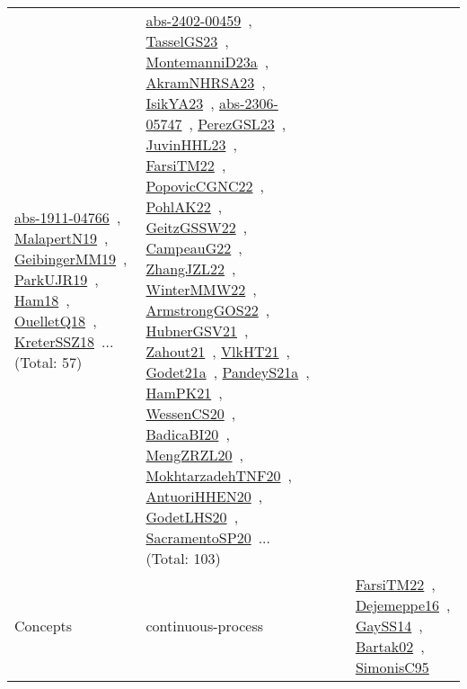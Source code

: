 {\begin{longtable}{lp{3cm}>{\raggedright\arraybackslash}p{6cm}>{\raggedright\arraybackslash}p{6cm}>{\raggedright\arraybackslash}p{8cm}}
\href{works/abs-1911-04766.pdf}{abs-1911-04766}~\cite{abs-1911-04766}, \href{works/MalapertN19.pdf}{MalapertN19}~\cite{MalapertN19}, \href{works/GeibingerMM19.pdf}{GeibingerMM19}~\cite{GeibingerMM19}, \href{works/ParkUJR19.pdf}{ParkUJR19}~\cite{ParkUJR19}, \href{works/Ham18.pdf}{Ham18}~\cite{Ham18}, \href{works/OuelletQ18.pdf}{OuelletQ18}~\cite{OuelletQ18}, \href{works/KreterSSZ18.pdf}{KreterSSZ18}~\cite{KreterSSZ18}... (Total: 57) & \href{works/abs-2402-00459.pdf}{abs-2402-00459}~\cite{abs-2402-00459}, \href{works/TasselGS23.pdf}{TasselGS23}~\cite{TasselGS23}, \href{works/MontemanniD23a.pdf}{MontemanniD23a}~\cite{MontemanniD23a}, \href{works/AkramNHRSA23.pdf}{AkramNHRSA23}~\cite{AkramNHRSA23}, \href{works/IsikYA23.pdf}{IsikYA23}~\cite{IsikYA23}, \href{works/abs-2306-05747.pdf}{abs-2306-05747}~\cite{abs-2306-05747}, \href{works/PerezGSL23.pdf}{PerezGSL23}~\cite{PerezGSL23}, \href{works/JuvinHHL23.pdf}{JuvinHHL23}~\cite{JuvinHHL23}, \href{works/FarsiTM22.pdf}{FarsiTM22}~\cite{FarsiTM22}, \href{works/PopovicCGNC22.pdf}{PopovicCGNC22}~\cite{PopovicCGNC22}, \href{works/PohlAK22.pdf}{PohlAK22}~\cite{PohlAK22}, \href{works/GeitzGSSW22.pdf}{GeitzGSSW22}~\cite{GeitzGSSW22}, \href{works/CampeauG22.pdf}{CampeauG22}~\cite{CampeauG22}, \href{works/ZhangJZL22.pdf}{ZhangJZL22}~\cite{ZhangJZL22}, \href{works/WinterMMW22.pdf}{WinterMMW22}~\cite{WinterMMW22}, \href{works/ArmstrongGOS22.pdf}{ArmstrongGOS22}~\cite{ArmstrongGOS22}, \href{works/HubnerGSV21.pdf}{HubnerGSV21}~\cite{HubnerGSV21}, \href{works/Zahout21.pdf}{Zahout21}~\cite{Zahout21}, \href{works/VlkHT21.pdf}{VlkHT21}~\cite{VlkHT21}, \href{works/Godet21a.pdf}{Godet21a}~\cite{Godet21a}, \href{works/PandeyS21a.pdf}{PandeyS21a}~\cite{PandeyS21a}, \href{works/HamPK21.pdf}{HamPK21}~\cite{HamPK21}, \href{works/WessenCS20.pdf}{WessenCS20}~\cite{WessenCS20}, \href{works/BadicaBI20.pdf}{BadicaBI20}~\cite{BadicaBI20}, \href{works/MengZRZL20.pdf}{MengZRZL20}~\cite{MengZRZL20}, \href{works/MokhtarzadehTNF20.pdf}{MokhtarzadehTNF20}~\cite{MokhtarzadehTNF20}, \href{works/AntuoriHHEN20.pdf}{AntuoriHHEN20}~\cite{AntuoriHHEN20}, \href{works/GodetLHS20.pdf}{GodetLHS20}~\cite{GodetLHS20}, \href{works/SacramentoSP20.pdf}{SacramentoSP20}~\cite{SacramentoSP20}... (Total: 103)\\
Concepts & continuous-process &  &  & \href{works/FarsiTM22.pdf}{FarsiTM22}~\cite{FarsiTM22}, \href{works/Dejemeppe16.pdf}{Dejemeppe16}~\cite{Dejemeppe16}, \href{works/GaySS14.pdf}{GaySS14}~\cite{GaySS14}, \href{works/Bartak02.pdf}{Bartak02}~\cite{Bartak02}, \href{works/SimonisC95.pdf}{SimonisC95}~\cite{SimonisC95}\\

\end{longtable}}
